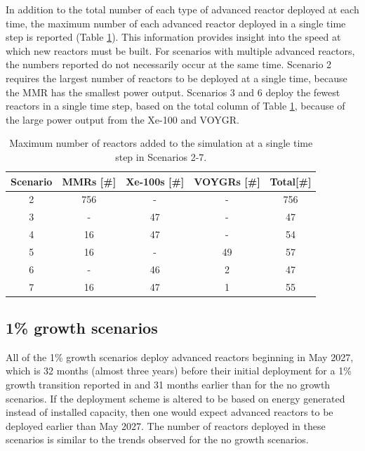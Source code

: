 In addition to the total number of each type of advanced reactor deployed 
at each time, the maximum number of each advanced reactor deployed in a 
single time step is reported (Table 
\ref{tab:reactors_added_nogrowth}). This information provides insight 
into the speed at which new reactors must be built. For scenarios with 
multiple advanced reactors, the numbers reported do not necessarily occur 
at the same time. Scenario 2 requires 
the largest number of reactors to be deployed at a single time, because 
the \gls{MMR} has the smallest power output. Scenarios 3 and 
6 deploy the fewest reactors in 
a single time step, based on the total column of Table 
\ref{tab:reactors_added_nogrowth}, because of the large power output from 
the Xe-100 and VOYGR. 

\begin{table}
    \centering 
    \caption{Maximum number of reactors added to the simulation at a 
    single time step in Scenarios 2-7.}
    \label{tab:reactors_added_nogrowth}
    \begin{tabular}{c c c c c}
        \hline
        Scenario & \glspl{MMR} [\#]& Xe-100s [\#]& VOYGRs [\#]
        & Total[\#]\\\hline
        2 & 756 & - & - & 756\\
        3 & - & 47 & - & 47\\
        4 & 16 & 47 & - & 54\\
        5 & 16 & - & 49 & 57\\
        6 & - & 46 & 2 & 47\\
        7 & 16 & 47 & 1 & 55\\
        \hline
    \end{tabular}
\end{table}

\subsection{1\% growth scenarios} \label{sec:1percent_reactors}
All of the 1\% growth scenarios deploy advanced reactors beginning 
in May 2027, which is 32 months (almost three years) before their initial 
deployment for a 1\% growth 
transition reported in \cite{bachmann_enrichment_2021} and 31 months 
earlier than for the no growth scenarios. If the deployment scheme is 
altered to be based on energy generated instead of installed capacity, 
then one would expect advanced reactors to be deployed earlier than May 
2027. The number of reactors deployed in these scenarios is similar to 
the trends observed for the no 
growth scenarios. 

